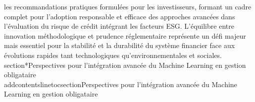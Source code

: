 les recommandations pratiques formulées pour les investisseurs, formant un cadre complet pour l'adoption responsable et efficace des approches avancées dans l'évaluation du risque de crédit intégrant les facteurs ESG. L'équilibre entre innovation méthodologique et prudence réglementaire représente un défi majeur mais essentiel pour la stabilité et la durabilité du système financier face aux évolutions rapides tant technologiques qu'environnementales et sociales.\n\n\\section*{Perspectives pour l'intégration avancée du Machine Learning en gestion obligataire}\n\\addcontentsline{toc}{section}{Perspectives pour l'intégration avancée du Machine Learning en gestion obligataire}